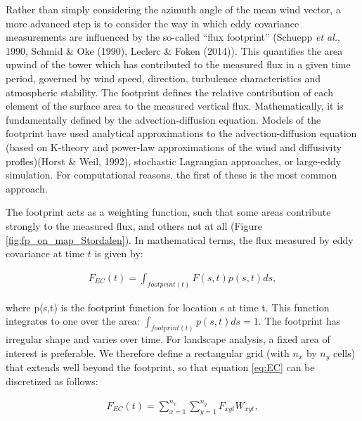 Rather than simply considering the azimuth angle of the mean wind
vector, a more advanced step is to consider the way in which eddy
covariance measurements are influenced by the so-called ``flux
footprint'' (Schuepp \emph{et al.}, 1990, Schmid \& Oke (1990), Leclerc
\& Foken (2014)). This quantifies the area upwind of the tower which has
contributed to the measured flux in a given time period, governed by
wind speed, direction, turbulence characteristics and atmospheric
stability. The footprint defines the relative contribution of each
element of the surface area to the measured vertical flux.
Mathematically, it is fundamentally defined by the advection-diffusion
equation. Models of the footprint have used analytical approximations to
the advection-diffusion equation (based on K-theory and power-law
approximations of the wind and diffusivity profles)(Horst \& Weil,
1992), stochastic Lagrangian approaches, or large-eddy simulation. For
computational reasons, the first of these is the most common approach.

The footprint acts as a weighting function, such that some areas
contribute strongly to the measured flux, and others not at all (Figure
\ref{fig:fp_on_map_Stordalen}). In mathematical terms, the flux
measured by eddy covariance at time \(t\) is given by:

\begin{align}   \label{eq:EC}
  F_{EC}(t) = \int_{footprint(t)} F(s,t) p(s,t) d s,
\end{align}

where p(s,t) is the footprint function for location s at time t. This function integrates to one over the area: \(\int_{footprint(t)} p(s,t) d s = 1\). The footprint has irregular shape and varies over time. For landscape analysis, a fixed area of interest is preferable. We therefore define a rectangular grid (with \(n_x\) by \(n_y\) cells) that extends well beyond the footprint, so that equation \ref{eq:EC} can be discretized as follows:

\begin{align}   \label{eq:weightMean}
  F_{EC}(t) = \sum_{x = 1}^{n_x} \sum_{y = 1}^{n_y} F_{xyt} W_{xyt},
\end{align}

